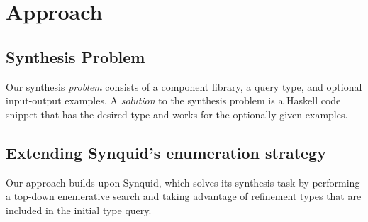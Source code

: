 \documentclass[acmsmall,nonacm]{acmart}
\begin{document}




\section{Approach}
\label{approach}



\subsection{Synthesis Problem}

Our synthesis \textit{problem} consists of a component library, a query type,
and optional input-output examples. A \textit{solution} to the synthesis 
problem is a Haskell code snippet that has the desired type and works 
for the optionally given examples.




 
  
\subsection{Extending Synquid's enumeration strategy} 

Our approach builds upon Synquid, which solves its synthesis task 
by performing a top-down enemerative search and taking advantage of
refinement types that are included in the initial type query. 
\end{document}
